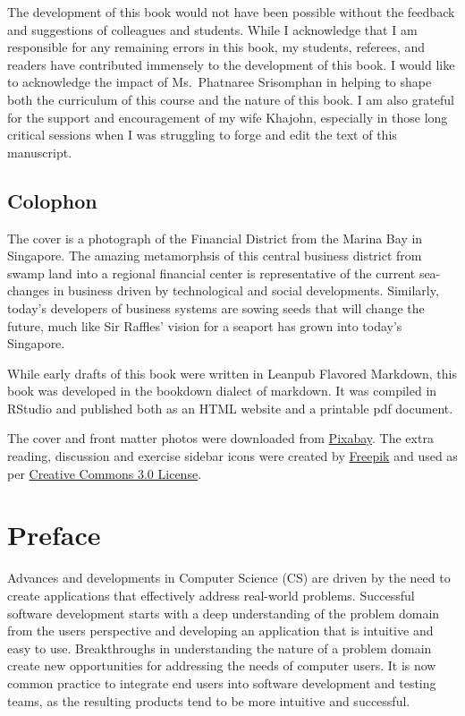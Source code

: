 \documentclass[]{book}
\begin{document}
The development of this book would not have been possible without the feedback and suggestions of colleagues and students. While I acknowledge that I am responsible for any remaining errors in this book, my students, referees, and readers have contributed immensely to the development of this book. I would like to acknowledge the impact of Ms.~Phatnaree Srisomphan in helping to shape both the curriculum of this course and the nature of this book. I am also grateful for the support and encouragement of my wife Khajohn, especially in those long critical sessions when I was struggling to forge and edit the text of this manuscript.

\hypertarget{colophon}{%
\section*{Colophon}\label{colophon}}

The cover is a photograph of the Financial District from the Marina Bay in Singapore. The amazing metamorphsis of this central business district from swamp land into a regional financial center is representative of the current sea-changes in business driven by technological and social developments. Similarly, today's developers of business systems are sowing seeds that will change the future, much like Sir Raffles' vision for a seaport has grown into today's Singapore.

While early drafts of this book were written in Leanpub Flavored Markdown, this book was developed in the bookdown dialect of markdown. It was compiled in RStudio and published both as an HTML website and a printable pdf document.

The cover and front matter photos were downloaded from \href{https://pixabay.com/images/search/singapore}{Pixabay}.
The extra reading, discussion and exercise sidebar icons were created by \href{https://www.freepik.com}{Freepik} and used as per \href{https://creativecommons.org/licenses/by/3.0}{Creative Commons 3.0 License}.

\hypertarget{preface}{%
\chapter*{Preface}\label{preface}}

Advances and developments in Computer Science (CS) are driven by the need to create applications that effectively address real-world problems. Successful software development starts with a deep understanding of the problem domain from the users perspective and developing an application that is intuitive and easy to use. Breakthroughs in understanding the nature of a problem domain create new opportunities for addressing the needs of computer users. It is now common practice to integrate end users into software development and testing teams, as the resulting products tend to be more intuitive and successful.
\end{document}
